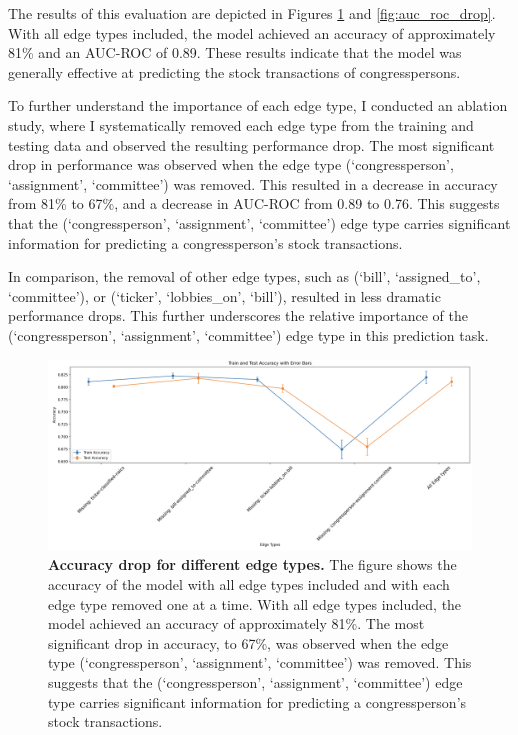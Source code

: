 \documentclass[15pt,letterpaper]{article}
\begin{document}
The results of this evaluation are depicted in Figures \ref{fig:accuracy_drop} and \ref{fig:auc_roc_drop}. With all edge types included, the model achieved an accuracy of approximately 81\% and an AUC-ROC of 0.89. These results indicate that the model was generally effective at predicting the stock transactions of congresspersons.

To further understand the importance of each edge type, I conducted an ablation study, where I systematically removed each edge type from the training and testing data and observed the resulting performance drop. The most significant drop in performance was observed when the edge type (`congressperson', `assignment', `committee') was removed. This resulted in a decrease in accuracy from 81\% to 67\%, and a decrease in AUC-ROC from 0.89 to 0.76. This suggests that the (`congressperson', `assignment', `committee') edge type carries significant information for predicting a congressperson's stock transactions.

In comparison, the removal of other edge types, such as (`bill', `assigned\_to', `committee'), or (`ticker', `lobbies\_on', `bill'), resulted in less dramatic performance drops. This further underscores the relative importance of the (`congressperson', `assignment', `committee') edge type in this prediction task.


\begin{figure}[h!]
  \centering
  \includegraphics[width=1.1\textwidth, height=0.4\textheight]{imgs/acc2.png}
  \caption{\textbf{Accuracy drop for different edge types.} The figure shows the accuracy of the model with all edge types included and with each edge type removed one at a time. With all edge types included, the model achieved an accuracy of approximately 81\%. The most significant drop in accuracy, to 67\%, was observed when the edge type (`congressperson', `assignment', `committee') was removed. This suggests that the (`congressperson', `assignment', `committee') edge type carries significant information for predicting a congressperson's stock transactions.}
  \label{fig:accuracy_drop}
\end{figure}  
\end{document}

